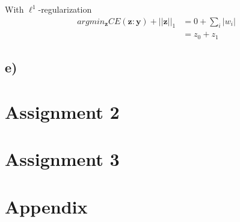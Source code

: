 \documentclass{article}
\begin{document}
With $\ell^1$-regularization
\begin{equation}
    \begin{split}
        argmin_\mathbf{z} CE(\mathbf{z}: \mathbf{y}) + ||\mathbf{z}||_1 &= 0 + \sum_i |w_i|\\
                                                                        &= z_0 + z_1
    \end{split}
\end{equation}

\subsection*{e)}

\section{Assignment 2}
\section{Assignment 3}

\section{Appendix} 
%     
\end{document}
